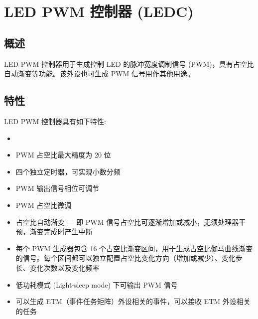 \documentclass[main\_\_CN.tex]{subfiles}
\begin{document}

\ifglobal
\else
    {\let\clearpage\relax \listoftodos}
    {\let\clearpage\relax \listofdonetodos}
    \tableofcontents
\fi



\hypertarget{ledpwm}{}
\chapter{LED PWM 控制器 (LEDC)}
\label{mod:ledpwm}

\section{概述}

LED PWM 控制器用于生成控制 LED 的脉冲宽度调制信号 (PWM)，具有占空比自动渐变等功能。该外设也可生成 PWM 信号用作其他用途。

\section{特性}
LED PWM 控制器具有如下特性:
\begin{itemize}
    \item {}
    \item PWM 占空比最大精度为 20 位
    \item 四个独立定时器，可实现小数分频
    \item PWM 输出信号相位可调节
    \item PWM 占空比微调
    \item 占空比自动渐变 — 即 PWM 信号占空比可逐渐增加或减小，无须处理器干预，渐变完成时产生中断
    \item 每个 PWM 生成器包含 16 个占空比渐变区间，用于生成占空比伽马曲线渐变的信号。每个区间都可以独立配置占空比变化方向（增加或减少）、变化步长、变化次数以及变化频率
    \item 低功耗模式 (Light-sleep mode) 下可输出 PWM 信号
    \item 可以生成 ETM（事件任务矩阵）外设相关的事件，可以接收 ETM 外设相关的任务
\end{itemize}
\end{document}
